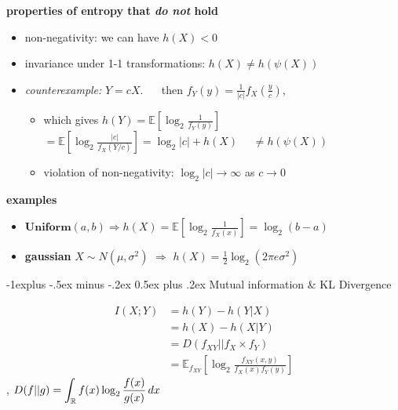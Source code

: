 \documentclass[10pt, landscape]{article}
\makeatletter
\renewcommand{\subsection}{\@startsection{subsection}{2}{0mm}%
  {-1explus -.5ex minus -.2ex}%
  {0.5ex plus .2ex}%
{\normalfont\normalsize\bfseries}}
\makeatother
\begin{document}
\begin{multicols*}{4}
  \textbf{properties of entropy that \textit{do not} hold}

  \begin{itemize}
    \item non-negativity: we can have $h(X) < 0$
    \item invariance under 1-1 transformations: $h(X) \neq h(\psi(X))$
    \item \textit{counterexample:} $Y=cX$.
      $\quad$ then $f_Y(y) = \frac{1}{\vert c \vert} f_X (\frac{y}{c})$, 
      \begin{itemize}
        \item which gives $h(Y) = \mathbb{E}[\log_2 \frac{1}{f_Y(y)}]$
          $= \mathbb{E}[\log_2 \frac{|c|}{f_X(Y/c)}] = \log_2|c| + h(X)$ $\quad \neq h(\psi(X))$
        \item violation of non-negativity: $\log_2|c| \to \infty$ as $c \to 0$
      \end{itemize}
  \end{itemize}

  \textbf{examples}

  \begin{itemize}
    \item $\textbf{Uniform}(a, b) \Rightarrow h(X) = \mathbb{E}[{\scriptscriptstyle \log_2 \frac{1}{f_X(x)}}] = \log_2(b-a)$
    \item \textbf{gaussian} $X \sim N(\mu, \sigma^2)$ $\Rightarrow$ $h(X) = \frac{1}{2}\log_2 (2\pi e \sigma^2)$
  \end{itemize}

  \subsection{Mutual information \& KL Divergence}

  \begin{tightcenter}
    \begin{align*}
      I(X;Y) &= h(Y) - h(Y \vert X) \\
             &= h(X) - h(X \vert Y) \\
             &= D(f_{XY} || f_X \times f_Y) \\
             &= \mathbb{E}_{f_{XY}} \left[ \log_2 \frac{f_{XY} (x,y)}{f_X(x) f_Y(y)} \right]
    \end{align*}
    , 
    \( {\displaystyle{ D(f||g) = \int_{\mathbb{R}} f(x) \log_2 \frac{f(x)}{g(x)}\mathop{dx}}} \) 
  \end{tightcenter}


\end{multicols*}
\end{document}
